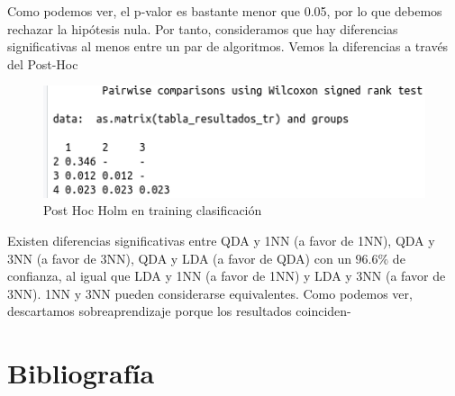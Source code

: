 Como podemos ver, el p-valor es bastante menor que 0.05, por lo que debemos rechazar la hipótesis nula. Por tanto, consideramos que hay diferencias significativas al menos entre un par de algoritmos. Vemos la diferencias a través del Post-Hoc

\begin{figure}[H] %
	\centering
	\includegraphics[scale=0.6]{ph-tr-c.png}  %
	\caption{Post Hoc Holm en training clasificación} 
	\label{fig:ph-tr-c}
\end{figure}

Existen diferencias significativas entre QDA y 1NN (a favor de 1NN), QDA y 3NN (a favor de 3NN), QDA y LDA (a favor de QDA) con un $96.6\%$ de confianza, al igual que LDA y 1NN (a favor de 1NN) y LDA y 3NN (a favor de 3NN). 1NN y 3NN pueden considerarse equivalentes. Como podemos ver, descartamos sobreaprendizaje porque los resultados coinciden-

\newpage
\section{Bibliografía}





